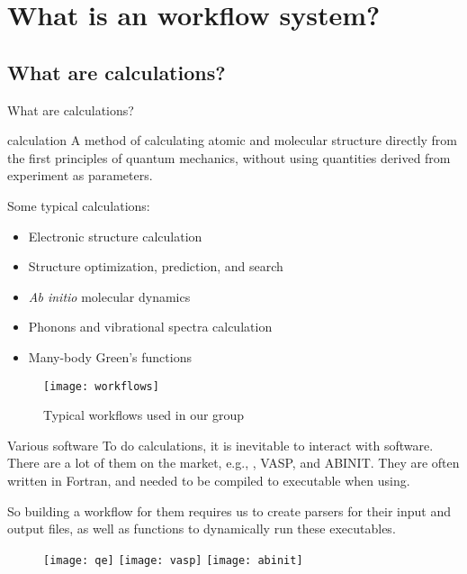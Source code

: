 \section{What is an \ab{} workflow system?}

\subsection{What are \ab{} calculations?}

\begin{frame}[allowframebreaks]{What are \ab{} calculations?}
    \begin{definitionblock}{\ab{} calculation}
        A method of calculating atomic and molecular structure directly from the first
        principles of quantum mechanics, without using quantities derived from experiment
        as parameters.
    \end{definitionblock}

    Some typical \ab{} calculations:
    \begin{itemize}
        \item Electronic structure calculation
        \item Structure optimization, prediction, and search
        \item \textit{Ab initio} molecular dynamics
        \item Phonons and vibrational spectra calculation
        \item Many-body Green's functions
    \end{itemize}

    \framebreak

    \begin{figure}[H]
        \centering
        \texttt{[image: workflows]}
        \caption{Typical \ab{} workflows used in our group}
        \label{eq:workflows}
    \end{figure}
\end{frame}

\begin{frame}{Various \ab{} software}
    To do \ab{} calculations, it is inevitable to interact with \ab{} software.
    There are a lot of them on the market, e.g., \qe{}, VASP, and ABINIT.
    They are often written in Fortran, and needed to be compiled to executable
    when using.

    So building a workflow for them requires us to create parsers for their input and output
    files, as well as functions to dynamically run these executables.

    \begin{figure}[b]
        \centering
        \texttt{[image: qe]}
        \hfill
        \texttt{[image: vasp]}
        \hfill
        \texttt{[image: abinit]}
        \label{fig:abinitsoftware}
    \end{figure}
\end{frame}
